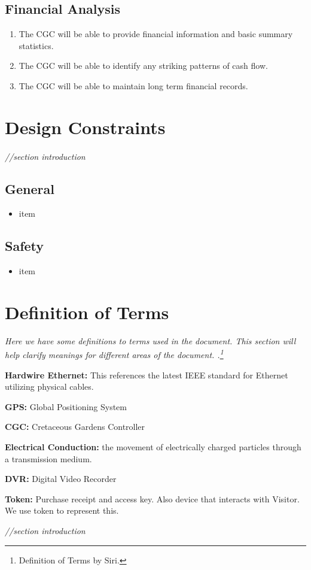 \documentclass[12pt]{article}
\begin{document}
	\subsection{Financial Analysis}
	\begin{enumerate}
		\item The CGC will be able to provide financial information and basic summary statistics.
		\item The CGC will be able to identify any striking patterns of cash flow.
		\item The CGC will be able to maintain long term financial records.
	\end{enumerate}

\section{Design Constraints} %
\label{con}
\paragraph{} \textit{//section introduction}
	\subsection{General}
	\begin{itemize}
		\item item
	\end{itemize}
	
	\subsection{Safety}
	\begin{itemize}
		\item item
	\end{itemize}

\section{Definition of Terms} %
\label{def}
\textit{Here we have some definitions to terms used in the document. This section will help clarify meanings for different areas of the document. .\footnote {Definition of Terms by Siri.}}
\begin{list}{}{}
	\item \textbf{Hardwire Ethernet: }This references the latest IEEE standard for Ethernet utilizing physical cables.
	\item \textbf{GPS: }Global Positioning System 
	\item \textbf{CGC: }Cretaceous Gardens Controller 
	\item \textbf{Electrical Conduction: }the movement of electrically charged particles through a transmission medium.
	\item \textbf{DVR: }Digital Video Recorder
	\item \textbf{Token: }Purchase receipt and access key. Also device that interacts with Visitor. We use token to represent this.
\end{list}

\textit{//section introduction}

\end{document}
